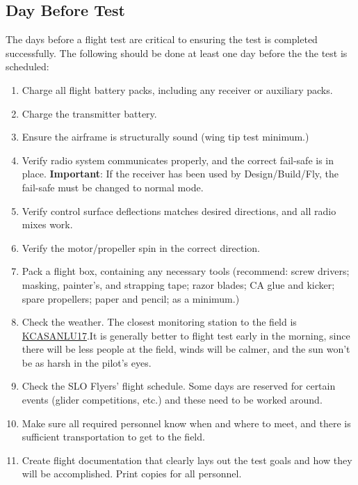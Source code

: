 \subsection{Day Before Test}
The days before a flight test are critical to ensuring the test is completed successfully. The following should be done at least one day before the the test is scheduled:
\begin{enumerate}
\item Charge all flight battery packs, including any receiver or auxiliary packs.
\item Charge the transmitter battery.
\item Ensure the airframe is structurally sound (wing tip test minimum.)
\item Verify radio system communicates properly, and the correct fail-safe is in place. \textbf{Important}: If the receiver has been used by Design/Build/Fly, the fail-safe must be changed to normal mode.
\item Verify control surface deflections matches desired directions, and all radio mixes work.
\item Verify the motor/propeller spin in the correct direction.
\item Pack a flight box, containing any necessary tools (recommend: screw drivers; masking, painter's, and strapping tape; razor blades; CA glue and kicker; spare propellers; paper and pencil; as a minimum.)
\item Check the weather. The closest monitoring station to the field is \href{http://www.wunderground.com/cgi-bin/findweather/getForecast?query=35.326\%2C-120.738\&sp=KCASANLU17}{KCASANLU17}.It is generally better to flight test early in the morning, since there will be less people at the field, winds will be calmer, and the sun won't be as harsh in the pilot's eyes.
\item Check the SLO Flyers' flight schedule. Some days are reserved for certain events (glider competitions, etc.) and these need to be worked around.
\item Make sure all required personnel know when and where to meet, and there is sufficient transportation to get to the field.
\item Create flight documentation that clearly lays out the test goals and how they will be accomplished. Print copies for all personnel.
\end{enumerate}
